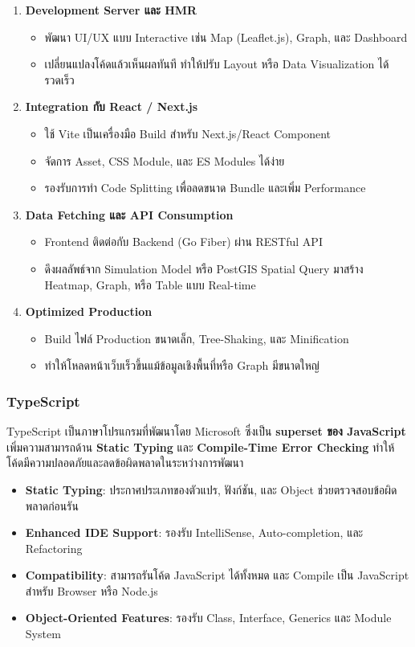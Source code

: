\begin{enumerate}
    \item \textbf{Development Server และ HMR}
    \begin{itemize}
        \item พัฒนา UI/UX แบบ Interactive เช่น Map (Leaflet.js), Graph, และ Dashboard
        \item เปลี่ยนแปลงโค้ดแล้วเห็นผลทันที ทำให้ปรับ Layout หรือ Data Visualization ได้รวดเร็ว
    \end{itemize}
    
    \item \textbf{Integration กับ React / Next.js}
    \begin{itemize}
        \item ใช้ Vite เป็นเครื่องมือ Build สำหรับ Next.js/React Component
        \item จัดการ Asset, CSS Module, และ ES Modules ได้ง่าย  
        \item รองรับการทำ Code Splitting เพื่อลดขนาด Bundle และเพิ่ม Performance
    \end{itemize}
    
    \item \textbf{Data Fetching และ API Consumption}
    \begin{itemize}
        \item Frontend ติดต่อกับ Backend (Go Fiber) ผ่าน RESTful API  
        \item ดึงผลลัพธ์จาก Simulation Model หรือ PostGIS Spatial Query มาสร้าง Heatmap, Graph, หรือ Table แบบ Real-time
    \end{itemize}
    
    \item \textbf{Optimized Production}
    \begin{itemize}
        \item Build ไฟล์ Production ขนาดเล็ก, Tree-Shaking, และ Minification  
        \item ทำให้โหลดหน้าเว็บเร็วขึ้นแม้ข้อมูลเชิงพื้นที่หรือ Graph มีขนาดใหญ่
    \end{itemize}
\end{enumerate}

\subsubsection{TypeScript}
TypeScript เป็นภาษาโปรแกรมที่พัฒนาโดย Microsoft ซึ่งเป็น \textbf{superset ของ JavaScript} เพิ่มความสามารถด้าน \textbf{Static Typing} และ \textbf{Compile-Time Error Checking} ทำให้โค้ดมีความปลอดภัยและลดข้อผิดพลาดในระหว่างการพัฒนา  
\begin{itemize}
    \item \textbf{Static Typing}: ประกาศประเภทของตัวแปร, ฟังก์ชัน, และ Object ช่วยตรวจสอบข้อผิดพลาดก่อนรัน
    \item \textbf{Enhanced IDE Support}: รองรับ IntelliSense, Auto-completion, และ Refactoring
    \item \textbf{Compatibility}: สามารถรันโค้ด JavaScript ได้ทั้งหมด และ Compile เป็น JavaScript สำหรับ Browser หรือ Node.js
    \item \textbf{Object-Oriented Features}: รองรับ Class, Interface, Generics และ Module System
\end{itemize}


